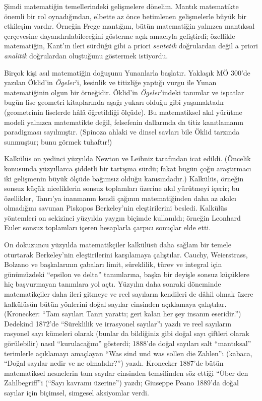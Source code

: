 Şimdi matematiğin temellerindeki gelişmelere dönelim. Mantık matematikte
önemli bir rol oynadığından, elbette az önce betimlenen gelişmelerle büyük
bir etkileşim vardır. Örneğin Frege mantığını, bütün matematiğin yalnızca
mantıksal çerçevesine dayandırılabileceğini gösterme açık amacıyla
geliştirdi; özellikle matematiğin, Kant'ın ileri sürdüğü gibi a priori
\emph{sentetik} doğrulardan değil a priori \emph{analitik} doğrulardan
oluştuğunu göstermek istiyordu.

Birçok kişi asıl matematiğin doğuşunu Yunanlarla başlatır. Yaklaşık MÖ
300'de yazılan Öklid'in \emph{Ögeler}'i, kesinlik ve titizliğe yaptığı
vurgu ile Yunan matematiğinin olgun bir örneğidir. Öklid'in \emph{Ögeler}'indeki
tanımlar ve ispatlar bugün lise geometri kitaplarında aşağı yukarı olduğu
gibi yaşamaktadır (geometrinin liselerde hâlâ öğretildiği ölçüde). Bu
matematiksel akıl yürütme modeli yalnızca matematikte değil, felsefenin
dallarında da titiz kanıtlamanın paradigması sayılmıştır. (Spinoza ahlaki ve
dinsel savları bile Öklid tarzında sunmuştur; bunu görmek tuhaftır!)

Kalkülüs on yedinci yüzyılda Newton ve Leibniz tarafından icat edildi.
(Öncelik konusunda yüzyıllarca şiddetli bir tartışma sürdü; fakat bugün çoğu
araştırmacı iki gelişmenin büyük ölçüde bağımsız olduğu kanısındadır.)
Kalkülüs, örneğin sonsuz küçük niceliklerin sonsuz toplamları üzerine akıl
yürütmeyi içerir; bu özellikler, Tanrı'ya inanmanın kendi çağının
matematiğinden daha az akılcı olmadığını savunan Piskopos Berkeley'nin
eleştirilerini besledi. Kalkülüs yöntemleri on sekizinci yüzyılda yaygın
biçimde kullanıldı; örneğin Leonhard Euler sonsuz toplamları içeren
hesaplarla çarpıcı sonuçlar elde etti.

On dokuzuncu yüzyılda matematikçiler kalkülüsü daha sağlam bir temele
oturtarak Berkeley'nin eleştirilerini karşılamaya çalıştılar. Cauchy,
Weierstrass, Bolzano ve başkalarının çabaları limit, süreklilik, türev ve
integral için günümüzdeki ``epsilon ve delta'' tanımlarına, başka bir
deyişle sonsuz küçüklere hiç başvurmayan tanımlara yol açtı. Yüzyılın daha
sonraki döneminde matematikçiler daha ileri gitmeye ve reel sayıların
kendileri de dâhil olmak üzere kalkülüsün bütün yönlerini doğal sayılar
cinsinden açıklamaya çalıştılar. (Kronecker: ``Tam sayıları Tanrı yarattı;
geri kalan her şey insanın eseridir.'') Dedekind 1872'de ``Süreklilik ve
irrasyonel sayılar''ı yazdı ve reel sayıların rasyonel sayı kümeleri olarak
(bunlar da bildiğiniz gibi doğal sayı çiftleri olarak görülebilir) nasıl
``kurulacağını'' gösterdi; 1888'de doğal sayıları salt ``mantıksal''
terimlerle açıklamayı amaçlayan ``Was sind und was sollen die Zahlen''ı
(kabaca, ``Doğal sayılar nedir ve ne olmalıdır?'') yazdı. Kronecker 1887'de
bütün matematiksel nesnelerin tam sayılar cinsinden temsilinden söz ettiği
``\"Uber den Zahlbegriff''i (``Sayı kavramı üzerine'') yazdı; Giuseppe Peano
1889'da doğal sayılar için biçimsel, simgesel aksiyomlar verdi.

